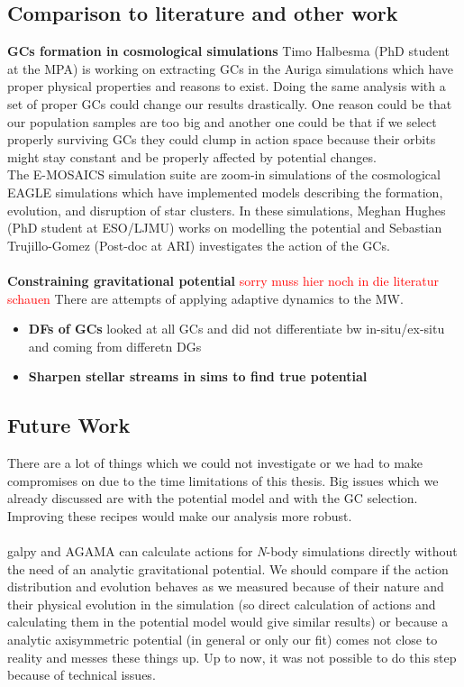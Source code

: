 \subsection{Comparison to literature and other work}
\textbf{\acp{GC} formation in cosmological simulations} Timo Halbesma (PhD student at the MPA) is working on extracting \acp{GC} in the Auriga simulations which have proper physical properties and reasons to exist. Doing the same analysis with a set of proper \acp{GC} could change our results drastically. One reason could be that our population samples are too big and another one could be that if we select properly surviving \acp{GC} they could clump in action space because their orbits might stay constant and be properly affected by potential changes.\\
The E-MOSAICS simulation suite \citep{Pfeffer...E-MOSAICS...2018, Kruijssen...E-MOSAICS.MW..2018} are zoom-in simulations of the cosmological EAGLE \citep{Schaye...EAGLE...2015} simulations which have implemented models describing the formation, evolution, and disruption of star clusters. In these simulations, Meghan Hughes (PhD student at ESO/LJMU) works on modelling the potential and Sebastian Trujillo-Gomez (Post-doc at ARI) investigates the action of the \acp{GC}. 
\\\\
\textbf{Constraining gravitational potential}
\textcolor{red}{sorry muss hier noch in die literatur schauen}
There are attempts of applying adaptive dynamics to the \ac{MW}.
\begin{itemize}
    \item \textbf{\acp{DF} of \acp{GC}} \citep{Posti...MWmassGCs...2018}
    looked at all GCs and did not differentiate bw in-situ/ex-situ and coming from differetn \acp{DG}
    \item \textbf{Sharpen stellar streams in sims to find true potential} \citep{Sanderson...streams..adaptivedyn...2015, Sanderson...gravpotstreams...2017}
\end{itemize}
\citet{Jean-Baptiste...accactionspace...2017}


\subsection{Future Work}
There are a lot of things which we could not investigate or we had to make compromises on due to the time limitations of this thesis. Big issues which we already discussed are with the potential model and with the \ac{GC} selection. Improving these recipes would make our analysis more robust.
\\\\
galpy and AGAMA \citep{Vasiliev...AGAMA...2019} can calculate actions for \textit{N}-body simulations directly without the need of an analytic gravitational potential. We should compare if the action distribution and evolution behaves as we measured because of their nature and their physical evolution in the simulation (so direct calculation of actions and calculating them in the potential model would give similar results) or because a analytic axisymmetric potential (in general or only our fit) comes not close to reality and messes these things up. Up to now, it was not possible to do this step because of technical issues. 

